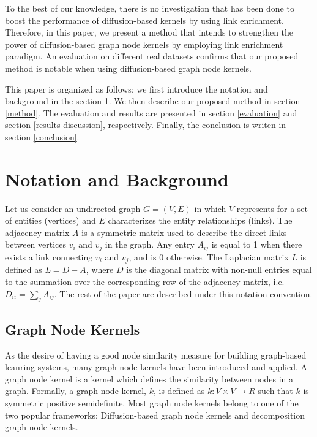 \documentclass[runningheads,a4paper]{llncs}
\begin{document}
To the best of our knowledge, there is no investigation that has been done to boost the performance of diffusion-based kernels by using link enrichment. Therefore, in this paper, we present a method that intends to strengthen the power of diffusion-based graph node kernels by employing link enrichment paradigm. An evaluation on different real datasets confirms that our proposed method is notable when using diffusion-based graph node kernels.

This paper is organized as follows: we first introduce the notation and background in the section \ref{background}. We then describe our proposed method in section \ref{method}. The evaluation and results are presented in section \ref{evaluation} and section \ref{results-discussion}, respectively. Finally, the conclusion is writen in section \ref{conclusion}.

\section{Notation and Background}
\label{background}
Let us consider an undirected graph $G = (V, E)$ in which $V$ represents for a set of entities (vertices)  and $E$ characterizes the entity relationships (links). The adjacency matrix $A$ is a symmetric matrix used to describe the direct links between vertices $v_{i}$ and $v_{j}$ in the graph. Any entry $A_{ij}$ is equal to 1 when there exists a link connecting $v_{i}$ and $v_{j}$, and is 0 otherwise. The Laplacian matrix $L$ is defined as $L = D-A$, where $D$ is the diagonal matrix with non-null entries equal to the summation over the corresponding row of the adjacency matrix, i.e. $D_{ii}=\sum_j A_{ij}$. The rest of the paper are described under this notation convention. 
\subsection{Graph Node Kernels}
As the desire of having a good node similarity measure for building graph-based leanring systems, many graph node kernels have been introduced and applied. A graph node kernel is a kernel which defines the similarity between nodes in a graph. Formally, a graph node kernel, $k$, is defined as $k: V \times V \longrightarrow R$ such that $k$ is symmetric positive semidefinite. Most graph node kernels belong to one of the two popular frameworks: Diffusion-based graph node kernels and decomposition graph node kernels. 
\end{document}
